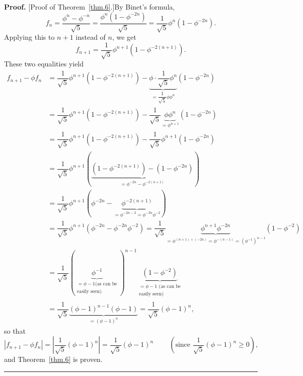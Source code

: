 \documentclass[numbers=enddot,12pt,final,onecolumn,notitlepage]{scrartcl}%
\numberwithin{exer}{section}
\theoremstyle{definition}
\newenvironment{proof}[1][Proof]{\noindent\textbf{#1.} }{\ \rule{0.5em}{0.5em}}
\begin{document}
\begin{proof}
[Proof of Theorem~\ref{thm.6}.]By Binet's formula,%
\[
f_{n}=\dfrac{\phi^{n}-\phi^{-n}}{\sqrt{5}}=\dfrac{\phi^{n}\left(  1-\phi
^{-2n}\right)  }{\sqrt{5}}=\dfrac{1}{\sqrt{5}}\phi^{n}\left(  1-\phi
^{-2n}\right)  .
\]
Applying this to $n+1$ instead of $n$, we get%
\[
f_{n+1}=\dfrac{1}{\sqrt{5}}\phi^{n+1}\left(  1-\phi^{-2\left(  n+1\right)
}\right)  .
\]
These two equalities yield%
\begin{align*}
f_{n+1}-\phi f_{n}  &  =\dfrac{1}{\sqrt{5}}\phi^{n+1}\left(  1-\phi^{-2\left(
n+1\right)  }\right)  -\underbrace{\phi\cdot\dfrac{1}{\sqrt{5}}\phi^{n}%
}_{=\dfrac{1}{\sqrt{5}}\phi\phi^{n}}\left(  1-\phi^{-2n}\right) \\
&  =\dfrac{1}{\sqrt{5}}\phi^{n+1}\left(  1-\phi^{-2\left(  n+1\right)
}\right)  -\dfrac{1}{\sqrt{5}}\underbrace{\phi\phi^{n}}_{=\phi^{n+1}}\left(
1-\phi^{-2n}\right) \\
&  =\dfrac{1}{\sqrt{5}}\phi^{n+1}\left(  1-\phi^{-2\left(  n+1\right)
}\right)  -\dfrac{1}{\sqrt{5}}\phi^{n+1}\left(  1-\phi^{-2n}\right) \\
&  =\dfrac{1}{\sqrt{5}}\phi^{n+1}\left(  \underbrace{\left(  1-\phi^{-2\left(
n+1\right)  }\right)  -\left(  1-\phi^{-2n}\right)  }_{=\phi^{-2n}%
-\phi^{-2\left(  n+1\right)  }}\right) \\
&  =\dfrac{1}{\sqrt{5}}\phi^{n+1}\left(  \phi^{-2n}-\underbrace{\phi
^{-2\left(  n+1\right)  }}_{=\phi^{-2n-2}=\phi^{-2n}\phi^{-2}}\right) \\
&  =\dfrac{1}{\sqrt{5}}\phi^{n+1}\left(  \phi^{-2n}-\phi^{-2n}\phi
^{-2}\right)  =\dfrac{1}{\sqrt{5}}\underbrace{\phi^{n+1}\phi^{-2n}}%
_{=\phi^{\left(  n+1\right)  +\left(  -2n\right)  }=\phi^{-\left(  n-1\right)
}=\left(  \phi^{-1}\right)  ^{n-1}}\left(  1-\phi^{-2}\right) \\
&  =\dfrac{1}{\sqrt{5}}\left(  \underbrace{\phi^{-1}}_{\substack{=\phi-1\text{
(as can be}\\\text{easily seen)}}}\right)  ^{n-1}\underbrace{\left(
1-\phi^{-2}\right)  }_{\substack{=\phi-1\text{ (as can be}\\\text{easily
seen)}}}\\
&  =\dfrac{1}{\sqrt{5}}\underbrace{\left(  \phi-1\right)  ^{n-1}\left(
\phi-1\right)  }_{=\left(  \phi-1\right)  ^{n}}=\dfrac{1}{\sqrt{5}}\left(
\phi-1\right)  ^{n},
\end{align*}
so that%
\[
\left\vert f_{n+1}-\phi f_{n}\right\vert =\left\vert \dfrac{1}{\sqrt{5}%
}\left(  \phi-1\right)  ^{n}\right\vert =\dfrac{1}{\sqrt{5}}\left(
\phi-1\right)  ^{n}\ \ \ \ \ \ \ \ \ \ \left(  \text{since }\dfrac{1}{\sqrt
{5}}\left(  \phi-1\right)  ^{n}\geq0\right)  ,
\]
and Theorem~\ref{thm.6} is proven.
\end{proof}
\end{document}
